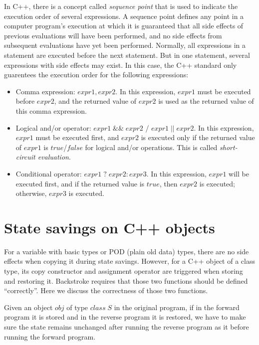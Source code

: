 \documentclass[12pt]{gatech-thesis}
\begin{document}
In C++, there is a concept called \emph{sequence point} that is used to indicate the execution order of several expressions. 
A sequence point defines any point in a computer program's execution at which it is guaranteed that all side effects of previous evaluations will have been performed, and no side effects from subsequent evaluations have yet been performed.
Normally, all expressions in a statement are executed before the next statement. 
But in one statement, several expressions with side effects may exist. 
In this case, the C++ standard  only guarentees the execution order for the following expressions:

\begin{itemize}

\item Comma expression: $expr1, expr2$. 
In this expression, $expr1$ must be executed before $expr2$, and the returned value of $expr2$ is used as the returned value of this comma expression.

\item Logical and/or operator: $expr1 \;\&\&\; expr2$ / $expr1\; ||\; expr2$. 
In this expression, $expr1$ must be executed first, and $expr2$ is  executed only if the returned value of $expr1$ is $true$/$false$ for logical and/or operations.
This is called \emph{short-circuit evaluation}.

\item Conditional operator: $expr1 \;?\; expr2 : expr3$. In this expression, $expr1$ will be executed first, and if the returned value is $true$, then $expr2$ is  executed; otherwise, $expr3$ is executed.

\end{itemize}



\section{State savings on C++ objects}

For a variable with basic types or POD (plain old data) types, there are no side effects when copying it during state savings.
However, for a C++ object of a class type, its copy constructor and assignment operator are triggered when storing and restoring it.
Backstroke requires that those two functions should be defined ``correctly''.
Here we discuss the correctness of those two functions.

Given an object $obj$ of type $class \;S$ in the original program, if in the forward program it is stored and in the reverse program it is restored, we have to make sure the state remains unchanged after running the reverse program as it before running the  forward program.
\end{document}
